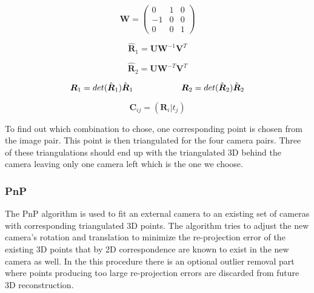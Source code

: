 \begin{equation}
\boldsymbol{W} = 	\begin{pmatrix}
					0  & 1 & 0 \\
					-1 & 0 & 0 \\
					0  & 0 & 1
					\end{pmatrix}
\end{equation}

\begin{equation}
\hat{\boldsymbol{R}}_1 = \boldsymbol{U W }^{-1} \boldsymbol{V}^T
\end{equation}

\begin{equation}
\hat{\boldsymbol{R}}_2 = \boldsymbol{U W }^{-T} \boldsymbol{V}^T
\end{equation}

\begin{equation}
\boldsymbol{R}_1 = det(\hat{\boldsymbol{R}}_1) \hat{\boldsymbol{R}}_1 
\hspace{2 cm}
\boldsymbol{R}_2 = det(\hat{\boldsymbol{R}}_2) \hat{\boldsymbol{R}}_2
\end{equation}

\begin{equation}
\boldsymbol{C}_{ij} = (\boldsymbol{R}_i | t_j)
\end{equation}

To find out which combination to chose, one corresponding point is chosen from the image pair. This point is then triangulated for the four camera pairs. Three of these triangulations should end up with the triangulated 3D behind the camera leaving only one camera left which is the one we choose. 

\subsubsection{PnP}
The PnP algorithm is used to fit an external camera to an existing set of cameras with corresponding triangulated 3D points. The algorithm tries to adjust the new camera's rotation and translation to minimize the re-projection error of the existing 3D points that by 2D correspondence are known to exist in the new camera as well. In the this procedure there is an optional outlier removal part where points producing too large re-projection errors are discarded from future 3D reconstruction. 

